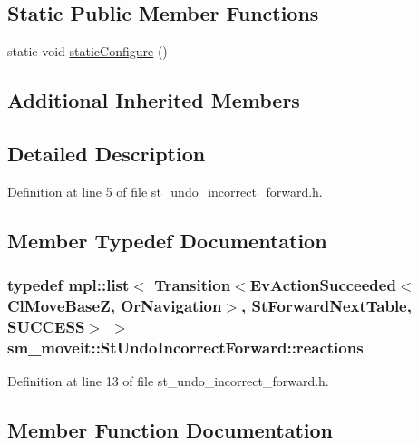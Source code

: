 \subsection*{Static Public Member Functions}
\begin{DoxyCompactItemize}
\item 
static void \hyperlink{structsm__moveit_1_1StUndoIncorrectForward_aaf7b67b7c1c8bdb912877d45ce629bed}{static\+Configure} ()
\end{DoxyCompactItemize}
\subsection*{Additional Inherited Members}


\subsection{Detailed Description}


Definition at line 5 of file st\+\_\+undo\+\_\+incorrect\+\_\+forward.\+h.



\subsection{Member Typedef Documentation}
\subsubsection[{\texorpdfstring{reactions}{reactions}}]{\setlength{\rightskip}{0pt plus 5cm}typedef mpl\+::list$<$ Transition$<$Ev\+Action\+Succeeded$<${\bf Cl\+Move\+BaseZ}, {\bf Or\+Navigation}$>$, {\bf St\+Forward\+Next\+Table}, {\bf S\+U\+C\+C\+E\+SS}$>$ $>$ {\bf sm\+\_\+moveit\+::\+St\+Undo\+Incorrect\+Forward\+::reactions}}\hypertarget{structsm__moveit_1_1StUndoIncorrectForward_a2c215b9ade720f753b2aa4719f96e787}{}\label{structsm__moveit_1_1StUndoIncorrectForward_a2c215b9ade720f753b2aa4719f96e787}


Definition at line 13 of file st\+\_\+undo\+\_\+incorrect\+\_\+forward.\+h.



\subsection{Member Function Documentation}
